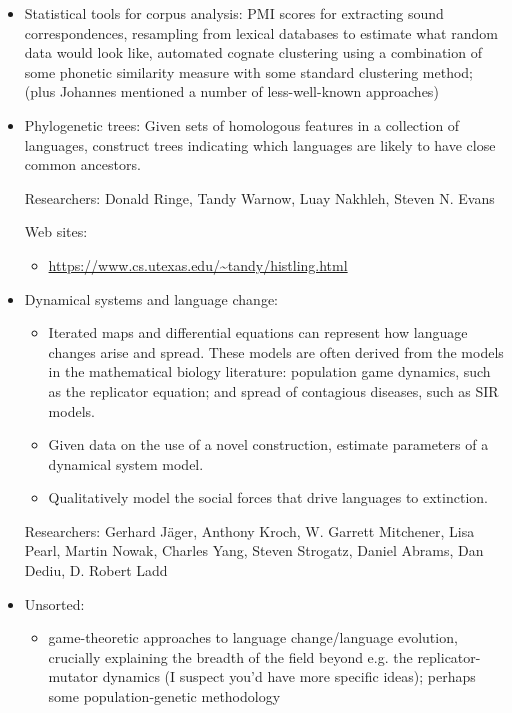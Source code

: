 \begin{itemize}

\item Statistical tools for corpus analysis:
  PMI scores for extracting sound correspondences, resampling from lexical databases to estimate what random data would look like, automated cognate clustering using a combination of some phonetic similarity measure with some standard clustering method; (plus Johannes mentioned a number of less-well-known approaches)

\item Phylogenetic trees:
 Given sets of homologous features in a collection of languages, construct trees indicating which languages are likely to have close common ancestors.

 Researchers: Donald Ringe, Tandy Warnow, Luay Nakhleh,
 Steven N. Evans

 Web sites:
 \begin{itemize}
 \item \url{https://www.cs.utexas.edu/~tandy/histling.html}
 \end{itemize}


\item Dynamical systems and language change:
 \begin{itemize}
 \item Iterated maps and differential equations can represent how
  language changes arise and spread.  These models are often
  derived from the models in the mathematical biology literature:
  population game dynamics, such as the replicator equation; and
  spread of contagious diseases, such as SIR models.


 \item Given data on the use of a novel construction, estimate parameters of a dynamical system model.

 \item  Qualitatively model the social forces that drive languages to extinction.
 \end{itemize}

 Researchers: Gerhard Jäger, Anthony Kroch, W. Garrett Mitchener, Lisa Pearl, Martin Nowak, Charles Yang, Steven Strogatz, Daniel Abrams, Dan Dediu, D. Robert Ladd


\item Unsorted:
 \begin{itemize}
 \item game-theoretic approaches to language change/language evolution, crucially explaining the breadth of the field beyond e.g. the replicator-mutator dynamics (I suspect you’d have more specific ideas); perhaps some population-genetic methodology


\end{itemize}
\end{itemize}
